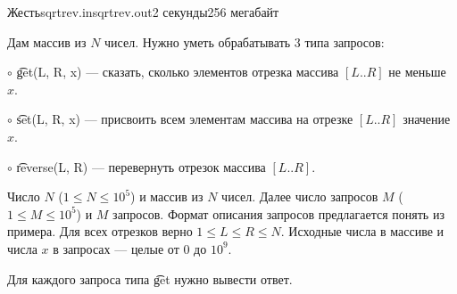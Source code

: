 
\begin{problem}{Жесть}{sqrtrev.in}{sqrtrev.out}{2 секунды}{256 мегабайт}{}

Дам массив из $N$ чисел. Нужно уметь обрабатывать 3 типа запросов:

$\circ$ \t{get(L, R, x)} --- сказать, сколько элементов отрезка массива $[L..R]$ не меньше $x$.

$\circ$ \t{set(L, R, x)} --- присвоить всем элементам массива на отрезке $[L..R]$ значение $x$.

$\circ$ \t{reverse(L, R)} --- перевернуть отрезок массива $[L..R]$.

\InputFile

Число $N$ ($1 \le N \le 10^5$) и массив из $N$ чисел.
Далее число запросов $M$ ($1 \le M \le 10^5$) и $M$ запросов.
Формат описания запросов предлагается понять из примера.
Для всех отрезков верно $1 \le L \le R \le N$.
Исходные числа в массиве и числа $x$ в запросах --- целые от $0$ до $10^9$.

\OutputFile

Для каждого запроса типа \t{get} нужно вывести ответ.

\Example

\begin{example}
%
\end{example}

\end{problem}
